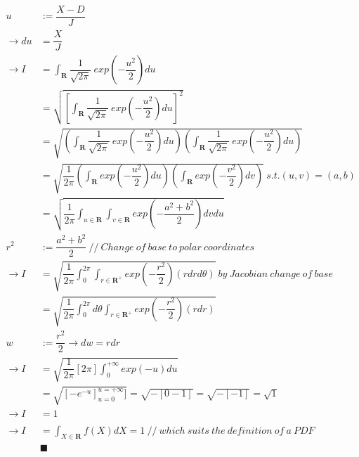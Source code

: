 \documentclass[]{article}
\begin{document}
			\begin{align*}
				u &:= \dfrac{X-D}{J} \\
				\to du &= \dfrac{X}{J} \\
				\to I &=\int_\mathbf{R} \dfrac{1}{\sqrt{2\pi}}\ exp(-\dfrac{u^2}{2})du \\
				&= \sqrt{[\int_\mathbf{R} \dfrac{1}{\sqrt{2\pi}}\ exp(-\dfrac{u^2}{2})du]^2} \\
				&= \sqrt{(\int_\mathbf{R} \dfrac{1}{\sqrt{2\pi}}\ exp(-\dfrac{u^2}{2})du)(\int_\mathbf{R} \dfrac{1}{\sqrt{2\pi}}\ exp(-\dfrac{u^2}{2})du)} \\
				&= \sqrt{\dfrac{1}{2\pi}(\int_\mathbf{R}exp(-\dfrac{u^2}{2})du)(\int_\mathbf{R}exp(-\dfrac{v^2}{2})dv)}\ s.t. (u,v)=(a,b) \\
				&= \sqrt{\dfrac{1}{2\pi}\int_{u\in\mathbf{R}}\int_{v\in\mathbf{R}}exp(-\dfrac{a^2+b^2}{2})dvdu} \\
				r^2 &:= \dfrac{a^2+b^2}{2}\ //\ Change\ of\ base\ to\ polar\ coordinates  \\
				\to I &= \sqrt{\dfrac{1}{2\pi}\int_0^{2\pi}\int_{r\in\mathbf{R}^+}exp(-\dfrac{r^2}{2})(rdrd\theta)}\ by\ Jacobian\ change\ of\ base \\
				&= \sqrt{\dfrac{1}{2\pi}\int_0^{2\pi}d\theta \int_{r\in\mathbf{R}^+}exp(-\dfrac{r^2}{2})(rdr)} \\
				w &:= \dfrac{r^2}{2} \to dw = rdr \\
				\to I &= \sqrt{\dfrac{1}{2\pi}[2\pi]\int_0^{+\infty} exp(-u)du} \\
				&= \sqrt{[-e^{-u}]_{u=0}^{u=+\infty}]}
				= \sqrt{-[0 - 1]} = \sqrt{-[-1]} = \sqrt{1} \\
				\to I &= 1 \\\\
				\to I &= \int_{X\in\mathbf{R}}f(X)dX = 1\ //\ which\ suits\ the\ definition\ of\ a\ PDF \\
				&\blacksquare
			\end{align*}
			
\end{document}
